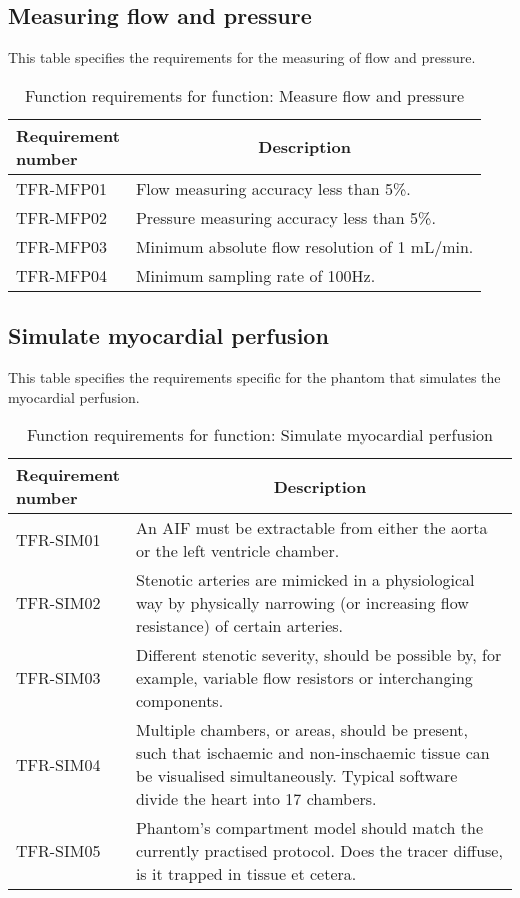 \subsection{Measuring flow and pressure}
\begin{table} [H]
\caption{Function requirements for function: Measure flow and pressure}
\label{tab:funcmeas}
This table specifies the requirements for the measuring of flow and pressure.
\begin{tabular}{l|p{120mm}|}
	\makecell[l]{\textbf{Requirement} \\  \textbf{number}} & \multicolumn{1}{c}{\textbf{Description}}\\
	\hline
	TFR-MFP01 & Flow measuring accuracy less than 5\%. \\
	TFR-MFP02 & Pressure measuring accuracy less than 5\%. \\
	TFR-MFP03 & Minimum absolute flow resolution of 1 mL/min. \\
	TFR-MFP04 & Minimum sampling rate of 100Hz. \\
	\cline{2-2}
\end{tabular}
\raggedright
\end{table}

\subsection{Simulate myocardial perfusion}
\begin{table} [H]
\caption{Function requirements for function: Simulate myocardial perfusion}
\label{tab:funcsim}
This table specifies the requirements specific for the phantom that simulates the myocardial perfusion.
\begin{tabular}{l|p{120mm}|}
	\makecell[l]{\textbf{Requirement} \\  \textbf{number}} & \multicolumn{1}{c}{\textbf{Description}}\\
	\hline
	TFR-SIM01 & An \ac{AIF} must be extractable from either the aorta or the left ventricle chamber.\\
	TFR-SIM02 & Stenotic arteries are mimicked in a physiological way by physically narrowing (or increasing flow resistance) of certain arteries. \\
	TFR-SIM03 & Different stenotic severity, should be possible by, for example, variable flow resistors or interchanging components. \\
	TFR-SIM04 & Multiple chambers, or areas, should be present, such that ischaemic and non-inschaemic tissue can be visualised simultaneously. Typical software divide the heart into 17 chambers.\\
	TFR-SIM05 & Phantom's compartment model should match the currently practised protocol. Does the tracer diffuse, is it trapped in tissue et cetera. \\
	\cline{2-2}
\end{tabular}
\raggedright
\end{table}


